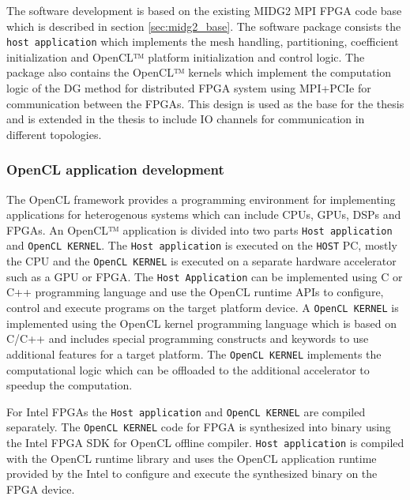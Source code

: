 The software development is based on the existing MIDG2 MPI FPGA code base
which is described in section \ref{sec:midg2_base}. The software package consists
the \texttt{host application} which implements the mesh handling, partitioning,
coefficient initialization and OpenCL™ platform initialization and control
logic. The package also contains the OpenCL™ kernels which implement
the computation logic of the DG method for distributed FPGA system using
MPI+PCIe for communication between the FPGAs. This design is used as the base
for the thesis and is extended in the thesis to include IO channels for communication
in different topologies.

\subsubsection{OpenCL application development}

The OpenCL framework provides a programming environment for implementing
applications for heterogenous systems which can include CPUs, GPUs,
DSPs and FPGAs. An OpenCL™ application is divided into two parts \texttt{Host application} and
\texttt{OpenCL KERNEL}. The \texttt{Host application} is executed on the \texttt{HOST} PC,
mostly the CPU and the \texttt{OpenCL KERNEL} is executed on a separate hardware accelerator
such as a GPU or FPGA. The \texttt{Host Application} can be implemented using
C or C++ programming language and use the OpenCL runtime APIs to configure, control
and execute programs on the target platform device. A \texttt{OpenCL KERNEL} is
implemented using the OpenCL kernel programming language which is based on C/C++
and includes special programming constructs and keywords to use additional features
for a target platform. The \texttt{OpenCL KERNEL} implements the computational
logic which can be offloaded to the additional accelerator to speedup the computation.

For Intel FPGAs the \texttt{Host application} and \texttt{OpenCL KERNEL} are compiled separately.
The \texttt{OpenCL KERNEL} code for FPGA is synthesized into binary using the Intel FPGA SDK for OpenCL
offline compiler. \texttt{Host application} is compiled with the OpenCL runtime library and uses the
OpenCL application runtime provided by the Intel to configure and execute the synthesized binary on the FPGA device.




